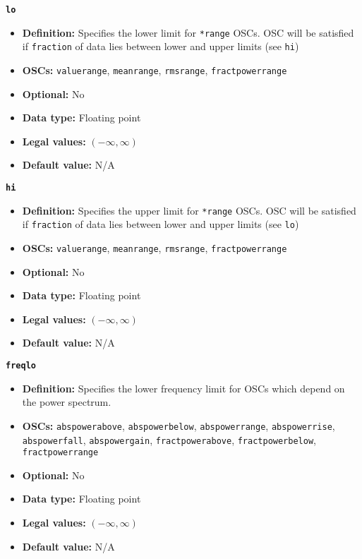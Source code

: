 {{\large\texttt{\textbf{lo}}}
\begin{itemize}
\item \textbf{Definition:} Specifies the lower limit for \texttt{*range}
  OSCs.  OSC will be satisfied if \texttt{fraction} of data lies between
  lower and upper limits (see \texttt{hi})
\item \textbf{OSCs:} \texttt{valuerange}, \texttt{meanrange},
  \texttt{rmsrange}, \texttt{fractpowerrange}
\item \textbf{Optional:} No
\item \textbf{Data type:} Floating point
\item \textbf{Legal values:} $(-\infty, \infty)$
\item \textbf{Default value:} N/A
\end{itemize}

{\large\texttt{\textbf{hi}}}
\begin{itemize}
\item \textbf{Definition:} Specifies the upper limit for \texttt{*range}
  OSCs.  OSC will be satisfied if \texttt{fraction} of data lies between
  lower and upper limits (see \texttt{lo})
\item \textbf{OSCs:} \texttt{valuerange}, \texttt{meanrange},
  \texttt{rmsrange}, \texttt{fractpowerrange}  
\item \textbf{Optional:} No
\item \textbf{Data type:} Floating point
\item \textbf{Legal values:} $(-\infty, \infty)$
\item \textbf{Default value:} N/A  
\end{itemize}

{\large\texttt{\textbf{freqlo}}}
\begin{itemize}
\item \textbf{Definition:} Specifies the lower frequency limit for OSCs
  which depend on the power spectrum.
\item \textbf{OSCs:} \texttt{abspowerabove}, \texttt{abspowerbelow}, 
  \texttt{abspowerrange}, 
  \texttt{abspowerrise}, 
  \texttt{abspowerfall},
  \texttt{abspowergain},
  \texttt{fractpowerabove},
  \texttt{fractpowerbelow}, \texttt{fractpowerrange} 
\item \textbf{Optional:} No
\item \textbf{Data type:} Floating point
\item \textbf{Legal values:} $(-\infty, \infty)$
\item \textbf{Default value:} N/A
\end{itemize}

}
